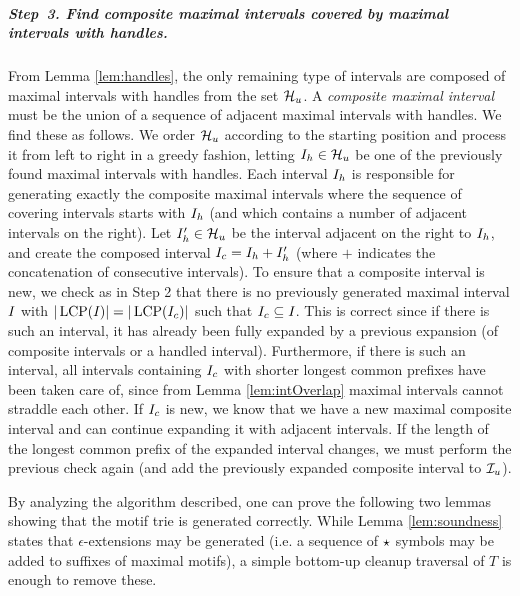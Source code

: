 \subparagraph*{Step~3. Find composite maximal intervals covered by maximal intervals with handles.}
%
From Lemma \ref{lem:handles}, the only remaining type of intervals are composed of maximal intervals with handles from the set $\mathcal{H}_{u}$. A \emph{composite maximal interval} must be the union of a sequence of adjacent maximal intervals with handles. We find these as follows. We order $\mathcal{H}_{u}$ according to the starting position and process it from left to right in a greedy fashion, letting $I_{h} \in \mathcal{H}_{u}$ be one of the previously found maximal intervals with handles. Each interval $I_{h}$ is responsible for generating exactly the composite maximal intervals where the sequence of covering intervals starts with $I_{h}$ (and which contains a number of adjacent intervals on the right). Let $I_{h}' \in \mathcal{H}_{u}$ be the interval adjacent on the right to $I_{h}$, and create the composed interval $I_{c} = I_{h} + I_{h}'$ (where $+$ indicates the concatenation of consecutive intervals). To ensure that a composite interval is new, we check as in Step 2 that there is no previously generated maximal interval $I_{}$ with $|\operatorname{LCP}(I_{})| = |\operatorname{LCP}(I_{c})|$ such that $I_{c} \subseteq I_{}$. This is correct since if there is such an interval, it has already been fully expanded by a previous expansion (of composite intervals or a handled interval). Furthermore, if there is such an interval, all intervals containing $I_{c}$ with shorter longest common prefixes have been taken care of, since from Lemma \ref{lem:intOverlap} maximal intervals cannot straddle each other. If $I_{c}$ is new, we know that we have a new maximal composite interval and can continue expanding it with adjacent intervals. If the length of the longest common prefix of the expanded interval changes, we must perform the previous check again (and add the previously expanded composite interval to $\mathcal{I}_{u}$).

\vspace{1em}
By analyzing the algorithm described, one can prove the following two lemmas showing that the motif trie is generated correctly. While Lemma \ref{lem:soundness} states that $\epsilon$-extensions may be generated (i.e. a sequence of $\star$ symbols may be added to suffixes of maximal motifs), a simple bottom-up cleanup traversal of $T$ is enough to remove these.

